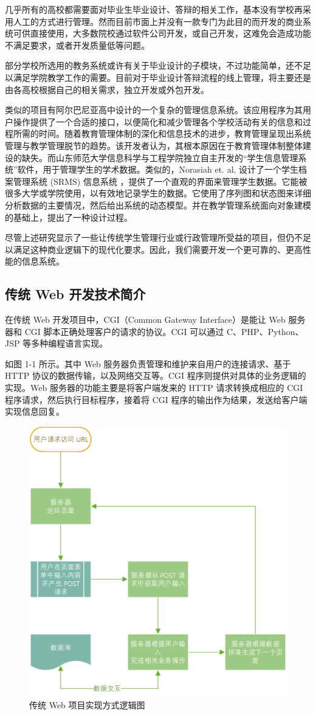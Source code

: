 几乎所有的高校都需要面对毕业生毕业设计、答辩的相关工作，基本没有学校再采用人工的方式进行管理。然而目前市面上并没有一款专门为此目的而开发的商业系统可供直接使用，大多数院校通过软件公司开发，或自己开发，这难免会造成功能不满足要求，或者开发质量低等问题。

部分学校所选用的教务系统或许有关于毕业设计的子模块，不过功能简单，还不足以满足学院教学工作的需要。目前对于毕业设计答辩流程的线上管理，将主要还是由各高校根据自己的相关需求，独立开发或外包开发。

类似的项目有阿尔巴尼亚高中设计的一个复杂的管理信息系统。该应用程序为其用户操作提供了一个合适的接口，以便简化和减少管理各个学校活动有关的信息和过程所需的时间。随着教育管理体制的深化和信息技术的进步，教育管理呈现出系统管理与教学管理脱节的趋势。该开发者认为，其根本原因在于教育管理体制整体建设的缺失。而山东师范大学信息科学与工程学院独立自主开发的“学生信息管理系统”软件，用于管理学生的学术数据。类似的，Norasiah et. al. 设计了一个学生档案管理系统 (SRMS) 信息系统 ，提供了一个直观的界面来管理学生数据。它能被很多大学或学院使用，以有效地记录学生的数据。它使用了序列图和状态图来详细分析数据的主要情况，然后给出系统的动态模型。并在教学管理系统面向对象建模的基础上，提出了一种设计过程。

尽管上述研究显示了一些让传统学生管理行业或行政管理所受益的项目，但仍不足以满足这种商业逻辑下的现代化要求。因此，我们需要开发一个更可靠的、更高性能的信息系统。


\subsection{传统 Web 开发技术简介}

在传统 Web 开发项目中，CGI（Common Gateway Interface）是能让 Web 服务器和 CGI 脚本正确处理客户的请求的协议。CGI 可以通过 C、PHP、Python、JSP 等多种编程语言实现。

如图 1-1 所示。其中 Web 服务器负责管理和维护来自用户的连接请求、基于 HTTP 协议的数据传输，以及网络交互等。CGI 程序则提供对具体的业务逻辑的实现。Web 服务器的功能主要是将客户端发来的 HTTP 请求转换成相应的 CGI 程序请求，然后执行目标程序，接着将 CGI 程序的输出作为结果，发送给客户端实现信息回复。

\begin{figure}
	\centering
	\includegraphics[width=0.7\linewidth]{figure/1-1}
	\caption{传统 Web 项目实现方式逻辑图}
\end{figure}

